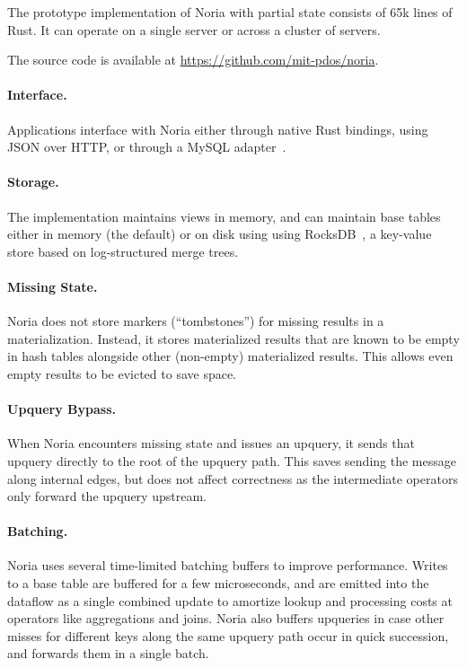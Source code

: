 The prototype implementation of Noria with partial state consists of 65k lines
of Rust. It can operate on a single server or across a cluster of servers.

The source code is available at \url{https://github.com/mit-pdos/noria}.

\paragraph{Interface.}
Applications interface with Noria either through native Rust bindings, using
JSON over HTTP, or through a MySQL adapter~\cite{noria-mysql}.

\paragraph{Storage.}
The implementation maintains views in memory, and can maintain base tables
either in memory (the default) or on disk using using RocksDB~\cite{rocksdb}, a
key-value store based on log-structured merge trees.

\paragraph{Missing State.}
Noria does not store markers (``tombstones'') for missing results in a
materialization. Instead, it stores materialized results that are known to be
empty in hash tables alongside other (non-empty) materialized results. This
allows even empty results to be evicted to save space.

\paragraph{Upquery Bypass.}
When Noria encounters missing state and issues an upquery, it sends that
upquery directly to the root of the upquery path. This saves sending the
message along internal edges, but does not affect correctness as the
intermediate operators only forward the upquery upstream.

\paragraph{Batching.}
Noria uses several time-limited batching buffers to improve performance. Writes
to a base table are buffered for a few microseconds, and are emitted into the
dataflow as a single combined update to amortize lookup and processing costs at
operators like aggregations and joins. Noria also buffers upqueries in case
other misses for different keys along the same upquery path occur in quick
succession, and forwards them in a single batch.

